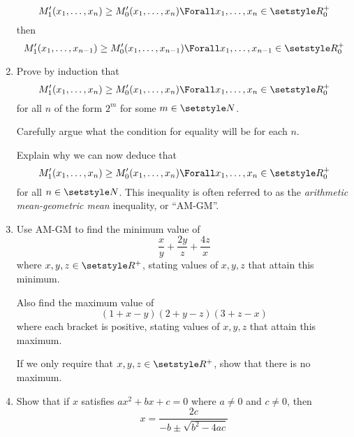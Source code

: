 \begin{enumerate}
  \begin{equation*}
   M_1'(x_1, \dotsc, x_n) \ge M_0'(x_1, \dotsc, x_n)
    \Forall x_1, \dotsc, x_n \in \Reals_0^+
  \end{equation*}
  then
  \begin{equation*}
   M_1'(x_1, \dotsc, x_{n - 1}) \ge M_0'(x_1, \dotsc, x_{n - 1})
    \Forall x_1, \dotsc, x_{n - 1} \in \Reals_0^+
  \end{equation*}
 \item
  Prove by induction that
  \begin{equation*}
   M_1'(x_1, \dotsc, x_n) \ge M_0'(x_1, \dotsc, x_n)
    \Forall x_1, \dotsc, x_n \in \Reals_0^+
  \end{equation*}
  for all \(n\) of the form \(2^m\) for some \(m \in \Naturals\).

  Carefully argue what the condition for equality will be for each \(n\).

  Explain why we can now deduce that
  \begin{equation*}
   M_1'(x_1, \dotsc, x_n) \ge M_0'(x_1, \dotsc, x_n)
    \Forall x_1, \dotsc, x_n \in \Reals_0^+
  \end{equation*}
  for all \(n \in \Naturals\). This inequality is often referred to as the
  \emph{arithmetic mean-geometric mean} inequality, or ``AM-GM''.
 \item
  Use AM-GM to find the minimum value of
  \begin{equation*}
   \frac xy + \frac{2y}z + \frac{4z}x
  \end{equation*}
  where \(x, y, z \in \Reals^+\), stating values of \(x, y, z\) that attain this
  minimum.

  Also find the maximum value of
  \begin{equation*}
   (1 + x - y)(2 + y - z)(3 + z - x)
  \end{equation*}
  where each bracket is positive, stating values of \(x, y, z\) that attain this
  maximum.

  If we only require that \(x, y, z \in \Reals^+\), show that there is no
  maximum.
 \item
  Show that if \(x\) satisfies \(ax^2 + bx + c = 0\) where \(a \ne 0\) and
  \(c \ne 0\), then
  \begin{equation*}
   x = \frac{2c}{-b \pm \sqrt{b^2 - 4ac}}
  \end{equation*}
\end{enumerate}
